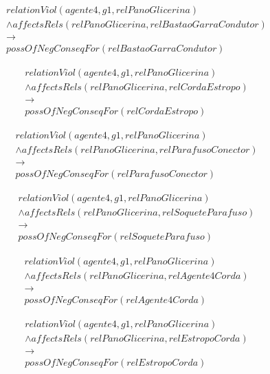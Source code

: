 \begin{eqnarray}\nonumber
	relationViol(agente4,g1,relPanoGlicerina)  \nonumber \\ 
	\wedge affectsRels(relPanoGlicerina,relBastaoGarraCondutor)   \nonumber \\ 
	\to \nonumber \\  
	possOfNegConseqFor(relBastaoGarraCondutor) 
\end{eqnarray}

\begin{eqnarray}\nonumber
	relationViol(agente4,g1,relPanoGlicerina)  \nonumber \\ 
	\wedge affectsRels(relPanoGlicerina,relCordaEstropo)   \nonumber \\ 
	\to \nonumber \\  
	possOfNegConseqFor(relCordaEstropo) 
\end{eqnarray}

\begin{eqnarray}\nonumber
	relationViol(agente4,g1,relPanoGlicerina)  \nonumber \\ 
	\wedge affectsRels(relPanoGlicerina,relParafusoConector)   \nonumber \\ 
	\to \nonumber \\  
	possOfNegConseqFor(relParafusoConector) 
\end{eqnarray}

\begin{eqnarray}\nonumber
	relationViol(agente4,g1,relPanoGlicerina)  \nonumber \\ 
	\wedge affectsRels(relPanoGlicerina,relSoqueteParafuso)   \nonumber \\ 
	\to \nonumber \\  
	possOfNegConseqFor(relSoqueteParafuso) 
\end{eqnarray}

\begin{eqnarray}\nonumber
	relationViol(agente4,g1,relPanoGlicerina)  \nonumber \\ 
	\wedge affectsRels(relPanoGlicerina,relAgente4Corda)   \nonumber \\ 
	\to \nonumber \\  
	possOfNegConseqFor(relAgente4Corda) 
\end{eqnarray}

\begin{eqnarray}\nonumber
	relationViol(agente4,g1,relPanoGlicerina)  \nonumber \\ 
	\wedge affectsRels(relPanoGlicerina,relEstropoCorda)   \nonumber \\ 
	\to \nonumber \\  
	possOfNegConseqFor(relEstropoCorda) 
\end{eqnarray}

